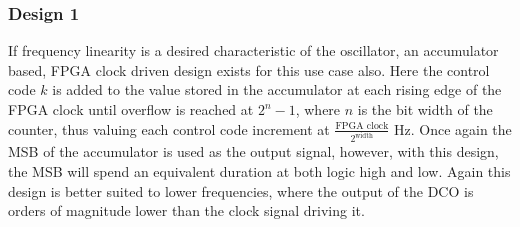 \documentclass[conference]{IEEEtran}
\begin{document}
{%

\subsubsection*{Design 1}
If frequency linearity is a desired characteristic of the oscillator, an accumulator based, FPGA clock driven design exists for this use case also. 
Here the control code $k$ is added to the value stored in the accumulator at each rising edge of the FPGA clock until overflow is reached at $2^n-1$, where $n$ is the bit width of the counter, thus valuing each control code increment at $\frac{\textrm{FPGA clock}}{2^{\textrm{width}}}$ Hz. Once again the MSB of the accumulator is used as the output signal, however, with this design, the MSB will spend an equivalent duration at both logic high and low.
Again this design is better suited to lower frequencies, where the output of the DCO is orders of magnitude lower than the clock signal driving it.

}
\end{document}
